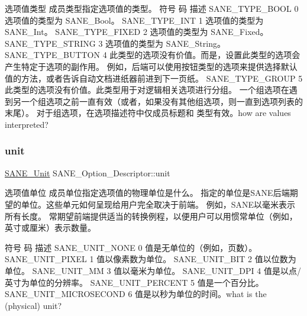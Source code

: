 选项值类型 成员类型指定选项值的类型。 符号 码 描述 S\+A\+N\+E\+\_\+\+T\+Y\+P\+E\+\_\+\+B\+O\+OL 0 选项值的类型为 S\+A\+N\+E\+\_\+\+Bool。 S\+A\+N\+E\+\_\+\+T\+Y\+P\+E\+\_\+\+I\+NT 1 选项值的类型为 S\+A\+N\+E\+\_\+\+Int。 S\+A\+N\+E\+\_\+\+T\+Y\+P\+E\+\_\+\+F\+I\+X\+ED 2 选项值的类型为 S\+A\+N\+E\+\_\+\+Fixed。 S\+A\+N\+E\+\_\+\+T\+Y\+P\+E\+\_\+\+S\+T\+R\+I\+NG 3 选项值的类型为 S\+A\+N\+E\+\_\+\+String。 S\+A\+N\+E\+\_\+\+T\+Y\+P\+E\+\_\+\+B\+U\+T\+T\+ON 4 此类型的选项没有价值。而是，设置此类型的选项会产生特定于选项的副作用。 例如，后端可以使用按钮类型的选项来提供选择默认值的方法，或者告诉自动文档进纸器前进到下一页纸。 S\+A\+N\+E\+\_\+\+T\+Y\+P\+E\+\_\+\+G\+R\+O\+UP 5 此类型的选项没有价值。此类型用于对逻辑相关选项进行分组。 一个组选项在遇到另一个组选项之前一直有效（或者，如果没有其他组选项，则一直到选项列表的末尾）。 对于组选项，在选项描述符中仅成员标题和 类型有效。how are values interpreted? \mbox{\label{structSANE__Option__Descriptor_a25b4534fcc925c6f316a3f180ec34435}} 
\subsubsection{\texorpdfstring{unit}{unit}}
{\footnotesize\ttfamily \hyperlink{sane_8h_a15e903425f365e0fe30fed1e37446990}{S\+A\+N\+E\+\_\+\+Unit} S\+A\+N\+E\+\_\+\+Option\+\_\+\+Descriptor\+::unit}

选项值单位 成员单位指定选项值的物理单位是什么。 指定的单位是\+S\+A\+N\+E后端期望的单位。这些单元如何呈现给用户完全取决于前端。 例如，\+S\+A\+N\+E以毫米表示所有长度。 常期望前端提供适当的转换例程，以便用户可以用惯常单位（例如，英寸或厘米）表示数量。

符号 码 描述 S\+A\+N\+E\+\_\+\+U\+N\+I\+T\+\_\+\+N\+O\+NE 0 值是无单位的（例如，页数）。 S\+A\+N\+E\+\_\+\+U\+N\+I\+T\+\_\+\+P\+I\+X\+EL 1 值以像素数为单位。 S\+A\+N\+E\+\_\+\+U\+N\+I\+T\+\_\+\+B\+IT 2 值以位数为单位。 S\+A\+N\+E\+\_\+\+U\+N\+I\+T\+\_\+\+MM 3 值以毫米为单位。 S\+A\+N\+E\+\_\+\+U\+N\+I\+T\+\_\+\+D\+PI 4 值是以点/英寸为单位的分辨率。 S\+A\+N\+E\+\_\+\+U\+N\+I\+T\+\_\+\+P\+E\+R\+C\+E\+NT 5 值是一个百分比。 S\+A\+N\+E\+\_\+\+U\+N\+I\+T\+\_\+\+M\+I\+C\+R\+O\+S\+E\+C\+O\+ND 6 值是以秒为单位的时间。what is the (physical) unit? \mbox{\label{structSANE__Option__Descriptor_af23d6a521f5ae9e57bdbda3e3bfb7526}} 

